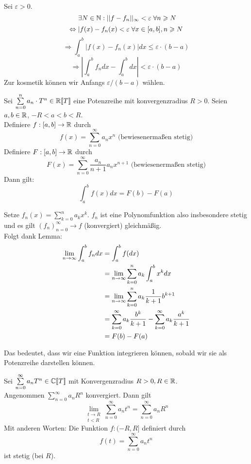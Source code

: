 \documentclass[main.tex]{subfiles}
\begin{document}
\begin{Beweis}
  Sei $\varepsilon > 0$.
  $$\;\exists N \in \mathbb{N} : ||f - f_n||_\infty < \varepsilon \;\forall n \geqslant N$$
  $$\Leftrightarrow |f(x)- f_n(x) < \varepsilon \;\forall x \in [a,b], n \geqslant N$$
  $$\Rightarrow \int_a^b|f(x)-f_n(x)|dx \leq \varepsilon \cdot (b-a)$$
  $$\Rightarrow \left|\int_a^b f_n dx - \int_a^b dx \right| < \varepsilon \cdot (b-a)$$
  Zur kosmetik können wir Anfangs $\varepsilon/(b-a)$ wählen.
\end{Beweis}

\begin{Korollar}
  Sei $\sum \limits_{n=0}^n a_n \cdot T^n \in \mathbb{R}[\![T]\!]$ eine Potenzreihe mit konvergenzradius $R > 0$. Seien $a,b \in \mathbb{R}$, $-R < a < b < R$.\\
  Definiere $f:[a,b] \to \mathbb{R}$ durch
  $$f(x) = \sum \limits_{n=0}^\infty a_n x^n \text{ (bewiesenermaßen stetig)}$$
  Definiere $F:[a,b] \to \mathbb{R}$ durch
  $$F(x) = \sum \limits_{n=0}^\infty \dfrac{a_n}{n+1}a_n x^{n+1} \text{ (bewiesenermaßen stetig)}$$
  Dann gilt:
  $$\int_a^b f(x)dx = F(b) - F(a)$$
\end{Korollar}

\begin{Beweis}
  Setze $f_n(x) = \sum \limits_{k=0}^n a_k x^k$. $f_n$ ist eine Polynomfunktion also insbesondere stetig und es gilt $(f_n)_{n=0}^\infty \to f$ (konvergiert) gleichmäßig.\\
  Folgt dank Lemma:
  $$\begin{aligned}
    \lim \limits_{n \to \infty} \int_a^b f_n dx &= \int_a^b f(dx)\\
    &= \lim \limits_{n \to \infty} \sum \limits_{k=0}^n a_k \int_a^b x^k dx \\
    &= \lim \limits_{n \to \infty} \sum \limits_{k=0}^n a_k \dfrac{1}{k+1} b^{k+1}\\
    &= \sum \limits_{k = 0}^\infty a_k \dfrac{b^k}{k+1} - \sum \limits_{k=0}^\infty a_k \dfrac{a^k}{k+1}\\
    &= F(b) - F(a)
  \end{aligned}$$
\end{Beweis}

\begin{Bemerkung}
  Das bedeutet, dass wir eine Funktion integrieren können, sobald wir sie als Potenzreihe darstellen können.
\end{Bemerkung}

\begin{Theorem}
  Sei $\sum \limits_{n=0}^\infty a_n T^n \in \mathbb{C}[\![T]\!]$ mit Konvergenzradius $R > 0, R \in \mathbb{R}$.\\
  Angenommen $\sum \limits_{n=0}^\infty a_n R^n$ konvergiert. Dann gilt
  $$ \lim \limits_{\substack{t \to R \\ t < R}} \sum \limits_{n=0}^\infty a_n t^n = \sum \limits_{n=0}^\infty a_n R^n$$
  Mit anderen Worten: Die Funktion $f:(-R,R]$ definiert durch
  $$f(t) = \sum \limits_{n=0}^\infty a_n t^n$$
  ist stetig (bei $R$).
\end{Theorem}
\end{document}
